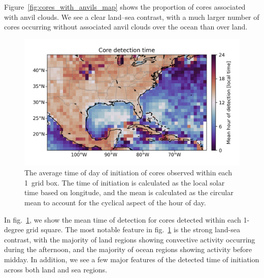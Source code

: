 
Figure~\ref{fig:cores_with_anvils_map} shows the proportion of cores associated with anvil clouds.
We see a clear land--sea contrast, with a much larger number of cores occurring without associated anvil clouds over the ocean than over land.

\begin{figure}[tp]
    \centering
    \includegraphics[width=\textwidth]{figures/chapter2_11.png}
    \caption[
    The average time of initiation of observed cores
    ]{
    The average time of day of initiation of cores observed within each 1\textdegree\ grid box. The time of initiation is calculated as the local solar time based on longitude, and the mean is calculated as the circular mean to account for the cyclical aspect of the hour of day.
    }
    \label{fig:core_detection_time_map}
\end{figure}

In fig.~\ref{fig:core_detection_time_map}, we show the mean time of detection for cores detected within each 1-degree grid square.
The most notable feature in fig.~\ref{fig:core_detection_time_map} is the strong land-sea contrast, with the majority of land regions showing convective activity occurring during the afternoon, and the majority of ocean regions showing activity before midday.
In addition, we see a few major features of the detected time of initiation across both land and sea regions.

